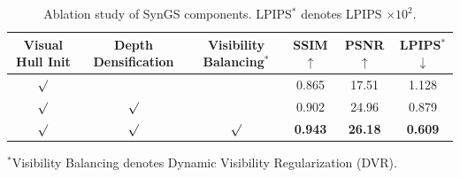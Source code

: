 \begin{table}[H]
\centering
\caption{\label{tab:ablation} Ablation study of SynGS components. LPIPS$^{*}$ denotes LPIPS $\times 10^{2}$.}
\setlength{\tabcolsep}{2.5mm}
\renewcommand{\arraystretch}{1.05}
\small
\begin{tabular}{@{}cccccc@{}}
\toprule
\scriptsize Visual Hull Init & \scriptsize Depth Densification & \scriptsize Visibility Balancing$^{*}$ & SSIM$\uparrow$ & PSNR$\uparrow$ & LPIPS$^{*}$$\downarrow$ \\
\midrule
$\surd$  &              &              & 0.865  & 17.51  & 1.128  \\
$\surd$  & $\surd$      &              & 0.902  & 24.96  & 0.879  \\
$\surd$  & $\surd$      & $\surd$      & \textbf{0.943} & \textbf{26.18} & \textbf{0.609} \\
\bottomrule
\end{tabular}

\vspace{0.3em}
{\footnotesize $^{*}$Visibility Balancing denotes Dynamic Visibility Regularization (DVR).}
\end{table}
